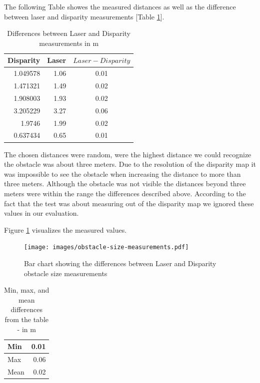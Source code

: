 \documentclass[11pt]{article}
\begin{document}
The following Table showes the measured distances as well as the difference between laser and disparity measurements [Table \ref{table:obstacle-size}]. 

\begin{table}[htbp]
	\begin{center}
	\begin{tabular}{|r|r|c|}
	\hline
	\multicolumn{1}{|l|}{Disparity} & \multicolumn{1}{l|}{Laser} & \multicolumn{1}{l|}{$Laser - Disparity$} \\ \hline
	1.049578 & 1.06 & 0.01 \\ \hline
	1.471321 & 1.49 & 0.02 \\ \hline
	1.908003 & 1.93 & 0.02 \\ \hline
	3.205229 & 3.27 & 0.06 \\ \hline
	1.9746 & 1.99 & 0.02 \\ \hline
	0.637434 & 0.65 & 0.01 \\ \hline
	\end{tabular}
	\end{center}
	\caption{Differences between Laser and Disparity measurements in m}
	\label{table:obstacle-size}
\end{table}
\pagebreak
The chosen distances were random, were the highest distance we could recognize the obstacle was about three meters. Due to the resolution of the disparity map it was impossible to see the obstacle when increasing the distance to more than three meters. Although the obstacle was not visible the distances beyond three meters were within the range the differences described above. According to the fact that the test was about measuring out of the disparity map we ignored these values in our evaluation.


Figure \ref{fig:obstacle-chart} visualizes the measured values.
\begin{figure}[H]
        \centering
        \texttt{[image: images/obstacle-size-measurements.pdf]}
        \caption{Bar chart showing the differences between Laser and Disparity obstacle size measurements}
        \label{fig:obstacle-chart}
\end{figure}

\begin{table}[htbp]
	\begin{center}
	\begin{tabular}{|l|r|}
	\hline
	Min & 0.01 \\ \hline
	Max & 0.06 \\ \hline
	Mean & 0.02 \\ \hline
	\end{tabular}
	\end{center}
	\caption{Min, max, and mean differences from the table - in m}
	\label{table:obstacle-results}
\end{table}
\end{document}
